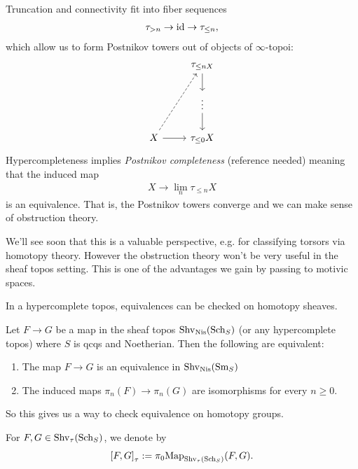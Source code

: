 \documentclass[11pt]{amsart}
\begin{document}
Truncation and connectivity fit into fiber sequences
\begin{align*}
    \tau_{>n} \to \mathrm{id} \to \tau_{\le n},
\end{align*}
which allow us to form Postnikov towers out of objects of $\infty$-topoi:
\[ \begin{tikzcd}
    & \tau_{\le n X}\dar \\
    & \vdots\dar\\
    X\rar\ar[uur,dashed] & \tau_{\le 0} X
\end{tikzcd} \]
Hypercompleteness implies \textit{Postnikov completeness} (reference needed) meaning that the induced map
\begin{align*}
    X \to \lim_n \tau_{\le n} X
\end{align*}
is an equivalence. That is, the Postnikov towers converge and we can make sense of obstruction theory.

We'll see soon that this is a valuable perspective, e.g. for classifying torsors via homotopy theory. However the obstruction theory won't be very useful in the sheaf topos setting. This is one of the advantages we gain by passing to motivic spaces.

\begin{upshot} In a hypercomplete topos, equivalences can be checked on homotopy sheaves.
\end{upshot}

\begin{corollary} Let $F \to G$ be a map in the sheaf topos $\mathrm{Shv}_{\mathrm{Nis}}(\mathrm{Sch}_S)$ (or any hypercomplete topos) where $S$ is qcqs and Noetherian. Then the following are equivalent:
\begin{enumerate}
    \item The map $F \to G$ is an equivalence in $\mathrm{Shv}_{\mathrm{Nis}}(\mathrm{Sm}_S)$
    \item The induced maps $\pi_n(F) \to \pi_n(G)$ are isomorphisms for every $n\ge 0$.
\end{enumerate}
\end{corollary}

So this gives us a way to check equivalence on homotopy groups.

\begin{notation} For $F,G \in \mathrm{Shv}_\tau(\mathrm{Sch}_S)$, we denote by 
\begin{align*}
    \left[ F,G \right]_\tau := \pi_0 \mathrm{Map}_{\mathrm{Shv}_\tau(\mathrm{Sch}_S)}(F,G).
\end{align*}
\end{notation}
\end{document}
